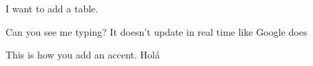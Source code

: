 
I want to add a table.

Can you see me typing? It doesn't update in real time like Google does

This is how you add an accent. Holá
